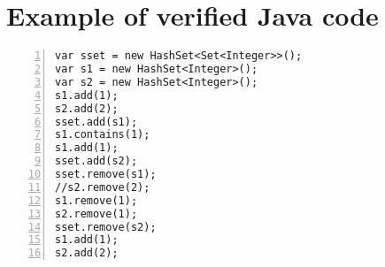 \appendix
\section{Example of verified Java code}\label{appendix}

\begin{lstlisting}[numbers=left]
var sset = new HashSet<Set<Integer>>();
var s1 = new HashSet<Integer>();
var s2 = new HashSet<Integer>();
s1.add(1);
s2.add(2);
sset.add(s1);
s1.contains(1);
s1.add(1);
sset.add(s2);
sset.remove(s1);
//s2.remove(2);
s1.remove(1);
s2.remove(1);
sset.remove(s2);
s1.add(1);
s2.add(2);
\end{lstlisting}
